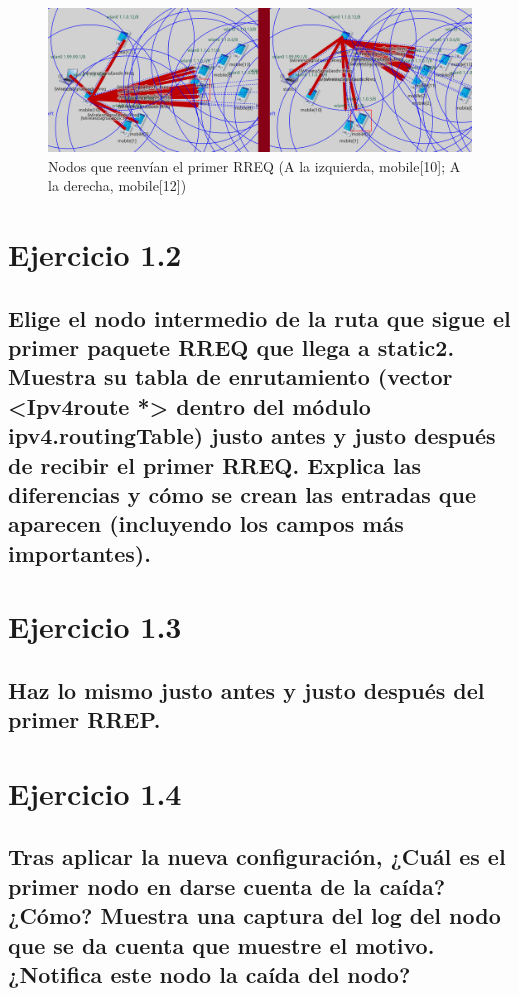 \begin{figure}[H]
    \centering
    \includegraphics[width=135mm, scale=0.75]{imaxes/ejercicio1_2.png}
    \caption{Nodos que reenvían el primer RREQ (A la izquierda, mobile[10]; A la derecha, mobile[12])}
    \label{fig:primer_rreq_transmission}
\end{figure}


\section{Ejercicio 1.2}

\subsection{Elige el nodo intermedio de la ruta que sigue el primer paquete RREQ que llega a static2. Muestra su tabla
de enrutamiento (vector <Ipv4route *> dentro del módulo ipv4.routingTable) justo antes y justo después de
recibir el primer RREQ. Explica las diferencias y cómo se crean las entradas que aparecen (incluyendo los campos
más importantes).}

\section{Ejercicio 1.3}

\subsection{Haz lo mismo justo antes y justo después del primer RREP.}

\section{Ejercicio 1.4}

\subsection{Tras aplicar la nueva configuración, ¿Cuál es el primer nodo en darse cuenta de la caída? ¿Cómo? Muestra una captura del log del nodo que se da
cuenta que muestre el motivo. ¿Notifica este nodo la caída del nodo?}

